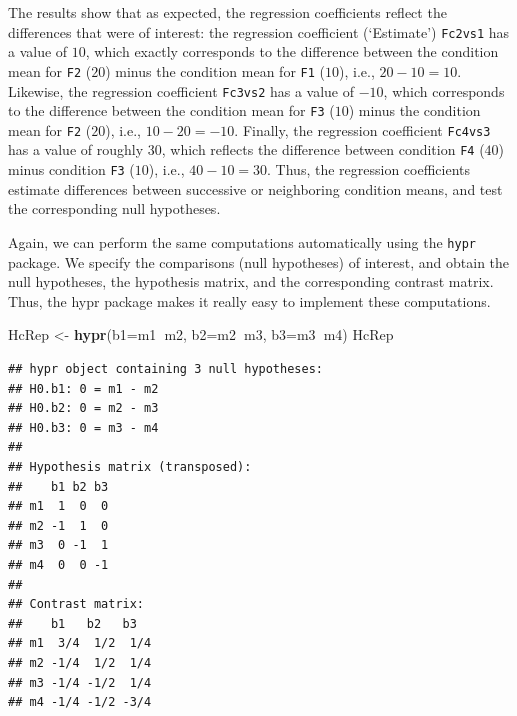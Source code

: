 \documentclass[12pt,]{krantz}
\newenvironment{Shaded}{\begin{snugshade}}{\end{snugshade}}
\newcommand{\DataTypeTok}[1]{\textcolor[rgb]{0.13,0.29,0.53}{#1}}
\newcommand{\KeywordTok}[1]{\textcolor[rgb]{0.13,0.29,0.53}{\textbf{#1}}}
\newcommand{\NormalTok}[1]{#1}
\newcommand{\OperatorTok}[1]{\textcolor[rgb]{0.81,0.36,0.00}{\textbf{#1}}}
\newcommand{\StringTok}[1]{\textcolor[rgb]{0.31,0.60,0.02}{#1}}
\theoremstyle{definition}
\theoremstyle{definition}
\theoremstyle{definition}
\theoremstyle{remark}
\begin{document}
The results show that as expected, the regression coefficients reflect the differences that were of interest: the regression coefficient (`Estimate') \texttt{Fc2vs1} has a value of \(10\), which exactly corresponds to the difference between the condition mean for \texttt{F2} (\(20\)) minus the condition mean for \texttt{F1} (\(10\)), i.e., \(20 - 10 = 10\). Likewise, the regression coefficient \texttt{Fc3vs2} has a value of \(-10\), which corresponds to the difference between the condition mean for \texttt{F3} (\(10\)) minus the condition mean for \texttt{F2} (\(20\)), i.e., \(10 - 20 = -10\). Finally, the regression coefficient \texttt{Fc4vs3} has a value of roughly \(30\), which reflects the difference between condition \texttt{F4} (\(40\)) minus condition \texttt{F3} (\(10\)), i.e., \(40 - 10 = 30\). Thus, the regression coefficients estimate differences between successive or neighboring condition means, and test the corresponding null hypotheses.

Again, we can perform the same computations automatically using the \texttt{hypr} package. We specify the comparisons (null hypotheses) of interest, and obtain the null hypotheses, the hypothesis matrix, and the corresponding contrast matrix. Thus, the hypr package makes it really easy to implement these computations.

\begin{Shaded}
\begin{Highlighting}[]
\NormalTok{HcRep <-}\StringTok{ }\KeywordTok{hypr}\NormalTok{(}\DataTypeTok{b1=}\NormalTok{m1}\OperatorTok{~}\NormalTok{m2, }\DataTypeTok{b2=}\NormalTok{m2}\OperatorTok{~}\NormalTok{m3, }\DataTypeTok{b3=}\NormalTok{m3}\OperatorTok{~}\NormalTok{m4)}
\NormalTok{HcRep}
\end{Highlighting}
\end{Shaded}

\begin{verbatim}
## hypr object containing 3 null hypotheses:
## H0.b1: 0 = m1 - m2
## H0.b2: 0 = m2 - m3
## H0.b3: 0 = m3 - m4
## 
## Hypothesis matrix (transposed):
##    b1 b2 b3
## m1  1  0  0
## m2 -1  1  0
## m3  0 -1  1
## m4  0  0 -1
## 
## Contrast matrix:
##    b1   b2   b3  
## m1  3/4  1/2  1/4
## m2 -1/4  1/2  1/4
## m3 -1/4 -1/2  1/4
## m4 -1/4 -1/2 -3/4
\end{verbatim}
\end{document}
